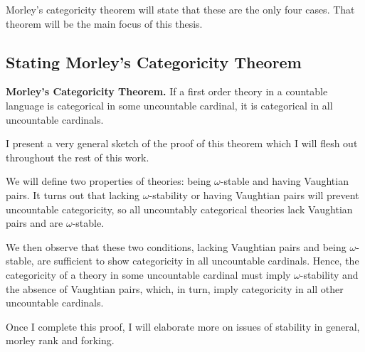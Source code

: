 Morley's categoricity theorem will state that these are the only four cases. 
That theorem will be the main focus of this thesis. 

\subsection{Stating Morley's Categoricity Theorem}

\textbf{Morley's Categoricity Theorem.} If a first order theory in a countable language is categorical in some uncountable cardinal, it is categorical in all uncountable cardinals. 

I present a very general sketch of the proof of this theorem which I will flesh out throughout the rest of this work. 

We will define two properties of theories: being \(\omega\)-stable and having Vaughtian pairs. 
It turns out that lacking \(\omega\)-stability or having Vaughtian pairs will prevent uncountable categoricity, so all uncountably categorical theories lack Vaughtian pairs and are \(\omega\)-stable. 

We then observe that these two conditions, lacking Vaughtian pairs and being \(\omega\)-stable, are sufficient to show categoricity in all uncountable cardinals. 
Hence, the categoricity of a theory in some uncountable cardinal must imply \(\omega\)-stability and the absence of Vaughtian pairs, which, in turn, imply categoricity in all other uncountable cardinals.

Once I complete this proof, I will elaborate more on issues of stability in general, morley rank and forking.  
